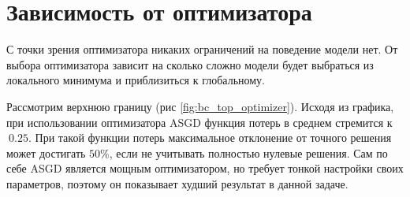 \section{Зависимость от оптимизатора}

С точки зрения оптимизатора никаких ограничений на поведение
модели нет. От выбора оптимизатора зависит на сколько сложно
модели будет выбраться из локального минимума и приблизиться
к глобальному.

Рассмотрим верхнюю границу (рис \ref{fig:bc_top_optimizer}).
Исходя из графика, при использовании оптимизатора ASGD
функция потерь в среднем стремится к $~0.25$. При такой 
функции потерь максимальное отклонение от точного решения
может достигать $50\%$, если не учитывать полностью
нулевые решения. Сам по себе ASGD является мощным оптимизатором,
но требует тонкой настройки своих параметров, поэтому он
показывает худший результат в данной задаче.


